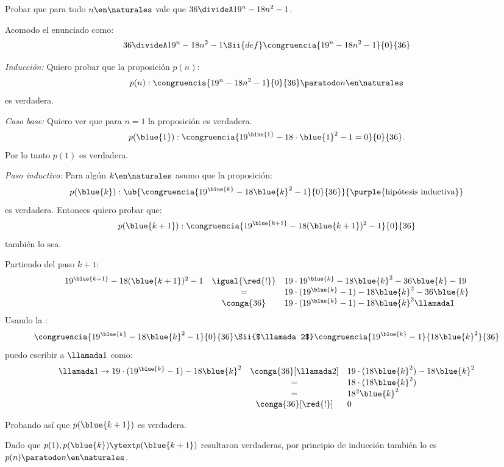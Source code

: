 \begin{enunciado}{\ejExtra}
  \begin{center}
    Probar que para todo $n \en \naturales$ vale que $36 \divideA 19^n -18n^2 - 1$.
  \end{center}
\end{enunciado}

Acomodo el enunciado como:
$$
  36 \divideA 19^n -18n^2 - 1
  \Sii{def}
  \congruencia{19^n -18n^2 - 1}{0}{36}
$$

\textit{Inducción:}
Quiero probar que la proposición $p(n)$:
$$
  p(n) : \congruencia{19^n -18n^2 - 1}{0}{36} \paratodo n \en \naturales
$$
es verdadera.

\bigskip

\textit{Caso base:}
Quiero ver que para $n=1$ la proposición es verdadera.
$$
  p(\blue{1}) : \congruencia{19^{\blue{1}} -18 \cdot \blue{1}^2 - 1 = 0}{0}{36}.
$$
Por lo tanto $p(1)$ es verdadera.

\textit{Paso inductivo:}
Para algún $k \en \naturales$ asumo que la proposición:
$$
  p(\blue{k}) :
  \ub{
    \congruencia{19^{\blue{k}} - 18 \blue{k}^2 - 1}{0}{36}
  }{
    \text{\purple{hipótesis inductiva}}
  }
$$
es verdadera. Entonces quiero probar que:
$$
  p(\blue{k + 1}) : \congruencia{19^{\blue{k + 1}} -18 (\blue{k + 1})^2 - 1}{0}{36}
$$
también lo sea.

Partiendo del paso $k+1$:
$$
  \begin{array}{rcl}
    19^{\blue{k + 1}} -18 (\blue{k + 1})^2 - 1
     & \igual{\red{!}} &
    19 \cdot 19^{\blue{k}} - 18 \blue{k}^2 - 36\blue{k} - 19  \\
     & =               &
    19 \cdot (19^{\blue{k}} - 1) - 18 \blue{k}^2 - 36\blue{k} \\
     & \conga{36}      &
    19 \cdot (19^{\blue{k}} - 1) - 18 \blue{k}^2 \llamada1
  \end{array}
$$
Usando la :
$$
  \congruencia{19^{\blue{k}} - 18 \blue{k}^2 - 1}{0}{36}
  \Sii{$\llamada2$}
  \congruencia{19^{\blue{k}} - 1}{18 \blue{k}^2}{36}
$$
puedo escribir a $\llamada1$ como:
$$
  \begin{array}{rcl}
    \llamada1 \to 19 \cdot (19^{\blue{k}} - 1) - 18 \blue{k}^2
     & \conga{36}[\llamada2] &
    19 \cdot (18\blue{k}^2) - 18 \blue{k}^2 \\
     & =                     &
    18 \cdot (18\blue{k}^2)                 \\
     & =                     &
    18^2 \blue{k}^2                         \\
     & \conga{36}[\red{!}]   &
    0
  \end{array}
$$

Probando así que $p(\blue{k + 1})$ es verdadera.

Dado que $p(1), p(\blue{k}) \ytext p(\blue{k+1})$ resultaron verdaderas, por principio de inducción también lo es $p(n) \paratodo n \en \naturales$.

\begin{aportes}
  \item {}
\end{aportes}

